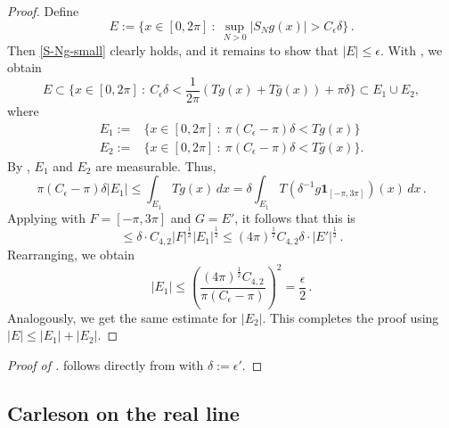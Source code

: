 \begin{proof}
\leanok
Define
\begin{equation*}
    E := \{x \in [0, 2\pi] \ : \ \sup_{N > 0} |S_N g (x)| > C_\epsilon \delta \} \,.
\end{equation*}
Then \eqref{S-Ng-small} clearly holds, and it remains to show that $|E| \le \epsilon$.
With , we obtain
\begin{equation*}
    E \subset \{x\in [0,2\pi] \ : \ C_\epsilon \delta < \frac{1}{2\pi} (Tg(x) + T\bar{g}(x)) + \pi\delta\} \subset E_1 \cup E_2,
\end{equation*}
where
\begin{align*}
    E_1 :=& \{x\in [0,2\pi] \ : \ \pi(C_\epsilon - \pi) \delta < Tg(x)\} \\
    E_2 :=& \{x\in [0,2\pi] \ : \ \pi(C_\epsilon - \pi) \delta < T\bar{g}(x)\}.
\end{align*}
By , $E_1$ and $E_2$ are measurable. Thus,
\begin{equation*}
    \pi(C_\epsilon - \pi) \delta |E_1| \le \int_{E_1} Tg(x) \, dx = \delta \int_{E_1} T(\delta^{-1} g\mathbf{1}_{[-\pi,3\pi]})(x) \, dx \,.
\end{equation*}
Applying  with $F = [-\pi, 3\pi]$ and $G = E'$, it follows that this is
\begin{equation*}
    \le \delta \cdot C_{4,2} |F|^{\frac{1}{2}} |E_1|^{\frac{1}{2}} \le (4\pi)^\frac{1}{2} C_{4,2} \delta \cdot |E'|^{\frac{1}{2}}\,.
\end{equation*}
Rearranging, we obtain
\begin{equation*}
    |E_1| \le \left(\frac{(4\pi)^\frac{1}{2} C_{4,2}}{\pi(C_\epsilon - \pi)}\right)^2 = \frac{\epsilon}{2}\,.
\end{equation*}
Analogously, we get the same estimate for $|E_2|$. This completes the proof using $|E| \le |E_1| + |E_2|$.
\end{proof}

\begin{proof}[Proof of ]
\leanok
     follows directly from  with $\delta:=\epsilon'$.
\end{proof}




\subsection{Carleson on the real line}
\label{10carleson}

